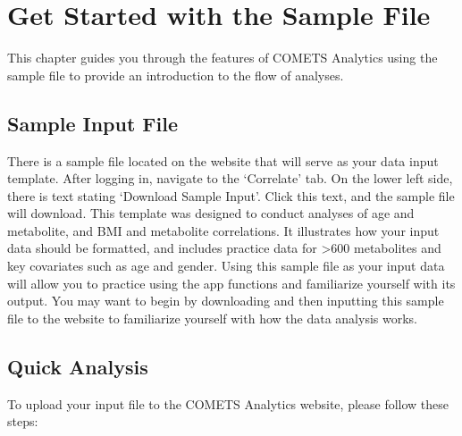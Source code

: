 \documentclass[]{book}
\begin{document}
\chapter{Get Started with the Sample File}\label{quickstart}

This chapter guides you through the features of COMETS Analytics using
the sample file to provide an introduction to the flow of analyses.

\section{Sample Input File}\label{sample-input-file}

There is a sample file located on the website that will serve as your
data input template. After logging in, navigate to the `Correlate' tab.
On the lower left side, there is text stating `Download Sample Input'.
Click this text, and the sample file will download. This template was
designed to conduct analyses of age and metabolite, and BMI and
metabolite correlations. It illustrates how your input data should be
formatted, and includes practice data for \textgreater{}600 metabolites
and key covariates such as age and gender. Using this sample file as
your input data will allow you to practice using the app functions and
familiarize yourself with its output. You may want to begin by
downloading and then inputting this sample file to the website to
familiarize yourself with how the data analysis works.

\section{Quick Analysis}\label{quick-analysis}

To upload your input file to the COMETS Analytics website, please follow
these steps:
\end{document}
